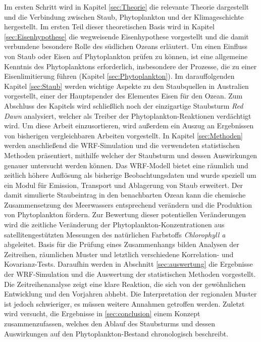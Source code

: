\documentclass[12pt,a4paper,onecolumn,headheight=30pt]{scrartcl}
\begin{document}
Im ersten Schritt wird in Kapitel \ref{sec:Theorie} die relevante Theorie dargestellt und die Verbindung zwischen Staub, Phytoplankton und der Klimageschichte hergestellt. Im ersten Teil dieser theoretischen Basis wird in Kapitel \ref{sec:Eisenhypothese} die wegweisende Eisenhypothese \citep{Martin.1990} vorgestellt und die damit verbundene besondere Rolle des südlichen Ozeans erläutert. Um einen Einfluss von Staub oder Eisen auf Phytoplankton prüfen zu können, ist eine allgemeine Kenntnis des Phytoplanktons erforderlich, insbesondere der Prozesse, die zu einer Eisenlimitierung führen (Kapitel \ref{sec:Phytoplankton}). Im darauffolgenden Kapitel \ref{sec:Staub} werden wichtige Aspekte zu den Staubquellen in Australien vorgestellt, einer der Hauptspender des Elementes Eisen für den Ozean. Zum Abschluss des Kapitels wird schließlich noch der einzigartige Staubsturm \textit{Red Dawn} analysiert, welcher als Treiber der Phytoplankton-Reaktionen verdächtigt wird. Um diese Arbeit einzusortieren, wird außerdem ein Auszug an Ergebnissen von bisherigen vergleichbaren Arbeiten vorgestellt. In Kapitel \ref{sec:Methoden} werden anschließend die WRF-Simulation und die verwendeten statistischen Methoden präsentiert, mithilfe welcher der Staubsturm und dessen Auswirkungen genauer untersucht werden können. Das WRF-Modell bietet eine räumlich und zeitlich höhere Auflösung als bisherige Beobachtungsdaten und wurde speziell um ein Modul für Emission, Transport und Ablagerung von Staub erweitert. Der damit simulierte Staubeintrag in den benachbarten Ozean kann die chemische Zusammensetzung des Meerwassers entsprechend verändern und die Produktion von Phytoplankton fördern. Zur Bewertung dieser potentiellen Veränderungen wird die zeitliche Veränderung der Phytoplankton-Konzentrationen aus satellitengestützten Messungen des natürlichen Farbstoffs \textit{Chlorophyll a} abgeleitet. Basis für die Prüfung eines Zusammenhangs bilden Analysen der Zeitreihen, räumlichen Muster und letztlich verschiedene Korrelation- und Kovarianz-Tests. Daraufhin werden in Abschnitt \ref{sec:auswertung} die Ergebnisse der WRF-Simulation und die Auswertung der statistischen Methoden vorgestellt. Die Zeitreihenanalyse zeigt eine klare Reaktion, die sich von der gewöhnlichen Entwicklung und den Vorjahren abhebt. Die Interpretation der regionalen Muster ist jedoch schwieriger, es müssen weitere Annahmen getroffen werden. Zuletzt wird versucht, die Ergebnisse in \ref{sec:conclusion} einem Konzept zusammenzufassen, welches den Ablauf des Staubsturms und dessen Auswirkungen auf den Phytoplankton-Bestand chronologisch beschreibt.
\end{document}
